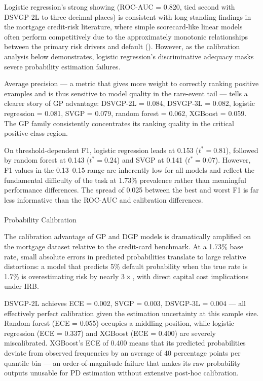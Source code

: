 \documentclass[
  letterpaper,
  DIV=11,
  numbers=noendperiod]{scrartcl}
\makeatletter
\let\oldparagraph\paragraph
\renewcommand{\paragraph}{
    \@ifstar
      \xxxParagraphStar
      \xxxParagraphNoStar
  }
\newcommand{\xxxParagraphStar}[1]{\oldparagraph*{#1}\mbox{}}
\newcommand{\xxxParagraphNoStar}[1]{\oldparagraph{#1}\mbox{}}
\makeatother
\begin{document}
Logistic regression's strong showing (ROC-AUC = 0.820, tied second with
DSVGP-2L to three decimal places) is consistent with long-standing
findings in the mortgage credit-risk literature, where simple
scorecard-like linear models often perform competitively due to the
approximately monotonic relationships between the primary risk drivers
and default (). However,
as the calibration analysis below demonstrates, logistic regression's
discriminative adequacy masks severe probability estimation failures.

Average precision --- a metric that gives more weight to correctly
ranking positive examples and is thus sensitive to model quality in the
rare-event tail --- tells a clearer story of GP advantage: DSVGP-2L =
0.084, DSVGP-3L = 0.082, logistic regression = 0.081, SVGP = 0.079,
random forest = 0.062, XGBoost = 0.059. The GP family consistently
concentrates its ranking quality in the critical positive-class region.

On threshold-dependent F1, logistic regression leads at 0.153
(\(t^* = 0.81\)), followed by random forest at 0.143 (\(t^* = 0.24\))
and SVGP at 0.141 (\(t^* = 0.07\)). However, F1 values in the 0.13--0.15
range are inherently low for all models and reflect the fundamental
difficulty of the task at 1.73\% prevalence rather than meaningful
performance differences. The spread of 0.025 between the best and worst
F1 is far less informative than the ROC-AUC and calibration differences.

\paragraph{Probability Calibration}\label{sec-fm-large-calibration}

The calibration advantage of GP and DGP models is dramatically amplified
on the mortgage dataset relative to the credit-card benchmark. At a
1.73\% base rate, small absolute errors in predicted probabilities
translate to large relative distortions: a model that predicts 5\%
default probability when the true rate is 1.7\% is overestimating risk
by nearly \(3\times\), with direct capital cost implications under IRB.

DSVGP-2L achieves ECE = 0.002, SVGP = 0.003, DSVGP-3L = 0.004 --- all
effectively perfect calibration given the estimation uncertainty at this
sample size. Random forest (ECE = 0.055) occupies a middling position,
while logistic regression (ECE = 0.337) and XGBoost (ECE = 0.400) are
severely miscalibrated. XGBoost's ECE of 0.400 means that its predicted
probabilities deviate from observed frequencies by an average of 40
percentage points per quantile bin --- an order-of-magnitude failure
that makes its raw probability outputs unusable for PD estimation
without extensive post-hoc calibration.
\end{document}
